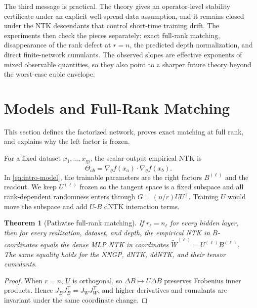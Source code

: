 \documentclass{article}
\newtheorem{theorem}{Theorem}[section]
\newcommand{\wh}{\widehat}
\newcommand{\wt}{\widetilde}
\begin{document}
The third message is practical. The theory gives an operator-level stability certificate under an explicit well-spread data assumption, and it remains closed under the NTK descendants that control short-time training drift. The experiments then check the pieces separately: exact full-rank matching, disappearance of the rank defect at \(r=n\), the predicted depth normalization, and direct finite-network cumulants. The observed slopes are effective exponents of mixed observable quantities, so they also point to a sharper future theory beyond the worst-case cubic envelope.

\section{Models and Full-Rank Matching}
This section defines the factorized network, proves exact matching at full rank, and explains why the left factor is frozen.

For a fixed dataset \(x_1,\ldots,x_m\), the scalar-output empirical NTK is
\begin{equation}
\wh\Theta_{ab}=\nabla_\theta f(x_a)\cdot \nabla_\theta f(x_b).
\end{equation}
In \eqref{eq:intro-model}, the trainable parameters are the right factors \(B^{(\ell)}\) and the readout. We keep \(U^{(\ell)}\) frozen so the tangent space is a fixed subspace and all rank-dependent randomness enters through \(G=(n/r)UU^\top\). Training \(U\) would move the subspace and add \(U\)-\(B\) dNTK interaction terms.

\begin{theorem}[Pathwise full-rank matching]
\label{thm:pathwise}
If \(r_\ell=n_\ell\) for every hidden layer, then for every realization, dataset, and depth, the empirical NTK in \(B\)-coordinates equals the dense MLP NTK in coordinates \(\wt W^{(\ell)}=U^{(\ell)}B^{(\ell)}\). The same equality holds for the NNGP, dNTK, ddNTK, and their tensor cumulants.
\end{theorem}

\begin{proof}
When \(r=n\), \(U\) is orthogonal, so \(\Delta B\mapsto U\Delta B\) preserves Frobenius inner products. Hence \(J_BJ_B^\top=J_WJ_W^\top\), and higher derivatives and cumulants are invariant under the same coordinate change.
\end{proof}
\end{document}
